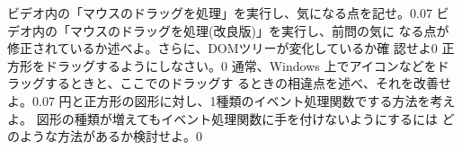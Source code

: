 \documentclass[a4j]{jreport}
\begin{document}
{
{\Must ビデオ内の「マウスのドラッグを処理」を実行し、気になる点を記せ。}{0.07}
{\Must ビデオ内の「マウスのドラッグを処理(改良版)」を実行し、前問の気に
なる点が修正されているか述べよ。さらに、DOMツリーが変化しているか確
認せよ}{0}
{\Must 正方形をドラッグするようにしなさい。}{0}
{通常、Windows 上でアイコンなどをドラッグするときと、ここでのドラッグす
るときの相違点を述べ、それを改善せよ。}{0.07}
{円と正方形の図形に対し、1種類のイベント処理関数でする方法を考えよ。
			 図形の種類が増えてもイベント処理関数に手を付けないようにするには
			 どのような方法があるか検討せよ。}{0}
       }
\end{document}
